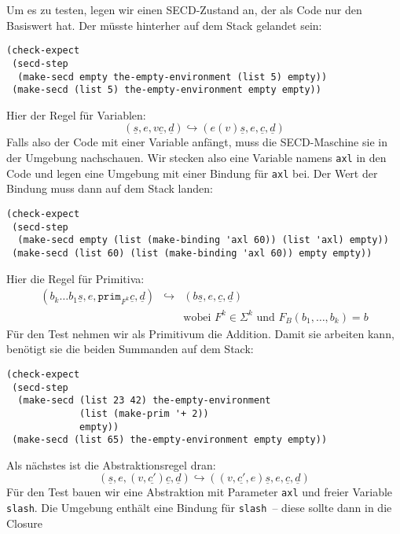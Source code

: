%
Um es zu testen, legen wir einen SECD-Zustand an, der als Code nur den
Basiswert hat.  Der müsste hinterher auf dem Stack gelandet sein:
%
\begin{lstlisting}
(check-expect
 (secd-step
  (make-secd empty the-empty-environment (list 5) empty))
 (make-secd (list 5) the-empty-environment empty empty))
\end{lstlisting}
%
Hier der Regel für Variablen:
%
\begin{displaymath}
  (\underline{s}, e, v\underline{c}, \underline{d})
  \hookrightarrow
  (e(v)\underline{s}, e, \underline{c}, \underline{d})
\end{displaymath}
%
Falls also der Code mit einer Variable anfängt, muss die SECD-Maschine
sie in der Umgebung nachschauen.  Wir stecken also eine Variable
namens \lstinline{axl} in den Code und legen eine Umgebung mit einer
Bindung für \lstinline{axl} bei.  Der Wert der Bindung muss dann auf
dem Stack landen:
%
\begin{lstlisting}
(check-expect
 (secd-step
  (make-secd empty (list (make-binding 'axl 60)) (list 'axl) empty))
 (make-secd (list 60) (list (make-binding 'axl 60)) empty empty))
\end{lstlisting}
%
Hier die Regel für Primitiva:
%
\begin{eqnarray*}
  (b_k\ldots b_1 \underline{s}, e, \mathtt{prim}_{F^k}\underline{c}, \underline{d})
  &\hookrightarrow&
  (b\underline{s}, e, \underline{c}, \underline{d})
  \\ && \textrm{wobei $F^k\in\Sigma^k$ und $F_B(b_1,\ldots,b_k) = b$}
\end{eqnarray*}
%
Für den Test nehmen wir als Primitivum die Addition.  Damit sie
arbeiten kann, benötigt sie die beiden Summanden auf dem Stack:
%
\begin{lstlisting}
(check-expect
 (secd-step
  (make-secd (list 23 42) the-empty-environment
             (list (make-prim '+ 2))
             empty))
 (make-secd (list 65) the-empty-environment empty empty))
\end{lstlisting}
%
Als nächstes ist die Abstraktionsregel dran:
%
\begin{displaymath}
  (\underline{s}, e, (v, \underline{c'}) \underline{c}, \underline{d})
  \hookrightarrow
  ((v, \underline{c'}, e) \underline{s}, e, \underline{c}, \underline{d})
\end{displaymath}
%
Für den Test bauen wir eine Abstraktion mit Parameter \lstinline{axl}
und freier Variable \lstinline{slash}.  Die Umgebung enthält 
eine Bindung für \lstinline{slash}~-- diese sollte dann in die Closure
